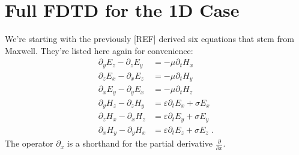 \documentclass[]{report}
\begin{document}
\section{Full FDTD for the 1D Case}
We're starting with the previously [REF] derived six equations that stem from Maxwell. They're listed here again for convenience:
\begin{align}
	\partial_y E_z - \partial_z E_y &= -\mu \partial_t H_x \\
	\partial_z E_x - \partial_x E_z &= -\mu \partial_t H_y \\
	\partial_x E_y - \partial_y E_x &= -\mu \partial_t H_z \\
	\partial_y H_z - \partial_z H_y &= \varepsilon \partial_t E_x + \sigma E_x \\
	\partial_z H_x - \partial_x H_z &= \varepsilon \partial_t E_y + \sigma E_y \\
	\partial_x H_y - \partial_y H_x &= \varepsilon \partial_t E_z + \sigma E_z \text{ .}
\end{align}
The operator \( \partial_x \) is a shorthand for the partial derivative \( \frac{\partial}{\partial x} \).
\end{document}
